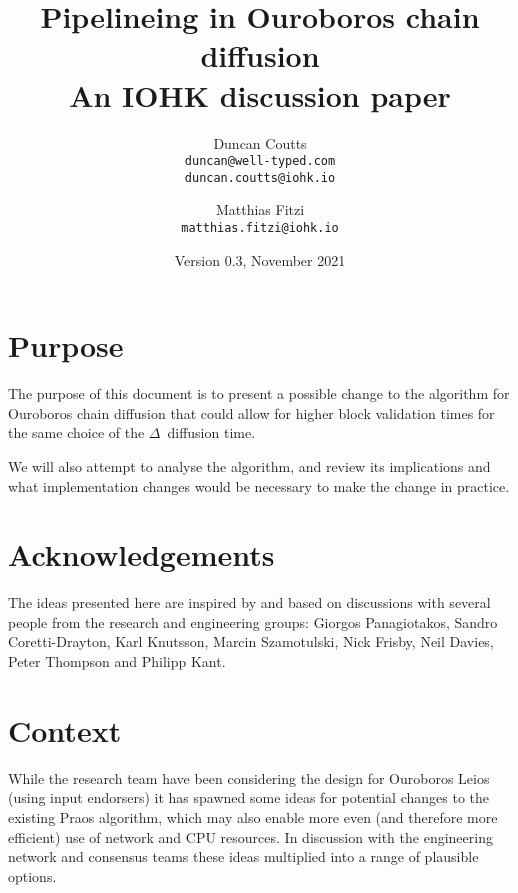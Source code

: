 \documentclass[11pt,a4paper]{article}
\begin{document}
\title{Pipelineing in Ouroboros chain diffusion\\
       {\large \sc An IOHK discussion paper}}
\date{Version 0.3, November 2021}
\author{Duncan Coutts      \\ {\small \texttt{duncan@well-typed.com}} \\
                              {\small \texttt{duncan.coutts@iohk.io}} \\
   \and Matthias Fitzi     \\ {\small \texttt{matthias.fitzi@iohk.io}}
   }

\maketitle

\section{Purpose}

The purpose of this document is to present a possible change to the algorithm
for Ouroboros chain diffusion that could allow for higher block validation times
for the same choice of the $\Delta$~diffusion time.

We will also attempt to analyse the algorithm, and review its implications and
what implementation changes would be necessary to make the change in practice.

\tableofcontents

\section{Acknowledgements}

The ideas presented here are inspired by and based on discussions with several
people from the research and engineering groups: Giorgos Panagiotakos,
Sandro Coretti-Drayton, Karl Knutsson, Marcin Szamotulski, Nick Frisby,
Neil Davies, Peter Thompson and Philipp Kant.

\section{Context}

While the research team have been considering the design for Ouroboros Leios
(using input endorsers) it has spawned some ideas for potential changes to
the existing Praos algorithm, which may also enable more even (and therefore
more efficient) use of network and CPU resources. In discussion with the
engineering network and consensus teams these ideas multiplied into a range of
plausible options.
\end{document}
